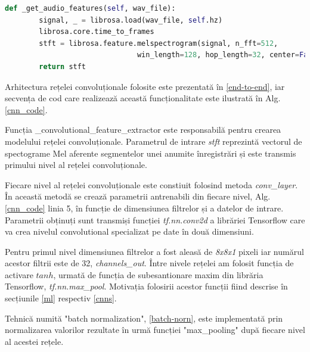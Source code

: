 \documentclass[a4paper,12pt]{book}
\begin{document}
				\begin{lstlisting}[language=Python, caption={Extragerea spectogramei Mel, 3.4.1, folosind libraria librosa.}, xleftmargin=0cm]
  def _get_audio_features(self, wav_file):
		signal, _ = librosa.load(wav_file, self.hz)
		librosa.core.time_to_frames
		stft = librosa.feature.melspectrogram(signal, n_fft=512, 
							   win_length=128, hop_length=32, center=False)
		return stft	\end{lstlisting} \par
				Arhitectura rețelei convoluționale folosite este prezentată în \ref{end-to-end}, iar secvența de cod care realizează această funcționalitate este ilustrată în Alg. \ref{cnn_code}. \par 
				Funcția \_convolutional\_feature\_extractor este responsabilă pentru crearea modelului rețelei convoluționale. Parametrul de intrare \textit{stft} reprezintă vectorul de spectograme Mel aferente segmentelor unei anumite înregistrări și este transmis primului nivel al rețelei convoluționale. \par
				Fiecare nivel al rețelei convoluționale este constiuit folosind metoda \textit{conv\_layer}. În această metodă se crează parametrii antrenabili din fiecare nivel, Alg.\ref{cnn_code} linia 5, în funcție de dimensiunea filtrelor și a datelor de intrare. Parametrii obținuți sunt transmiși funcției \textit{tf.nn.conv2d} a librăriei Tensorflow care va crea nivelul convolutional specializat pe date în două dimensiuni. \par
				Pentru primul nivel dimensiunea filtrelor a fost aleasă de \textit{8x8x1} pixeli iar numărul acestor filtrii este de 32, \textit{channels\_out}. Între nivele rețelei am folosit funcția de activare $tanh$, urmată de funcția de subesantionare maxim din librăria Tensorflow, \textit{tf.nn.max\_pool}. Motivația folosirii acestor funcții fiind descrise în secțiunile \ref{ml} respectiv \ref{cnns}.
				
				Tehnică numită "batch normalization", \ref{batch-norn}, este implementată prin normalizarea  valorilor rezultate în urmă funcției  "max\_pooling" după fiecare nivel al acestei rețele. \par 
				
\end{document}
